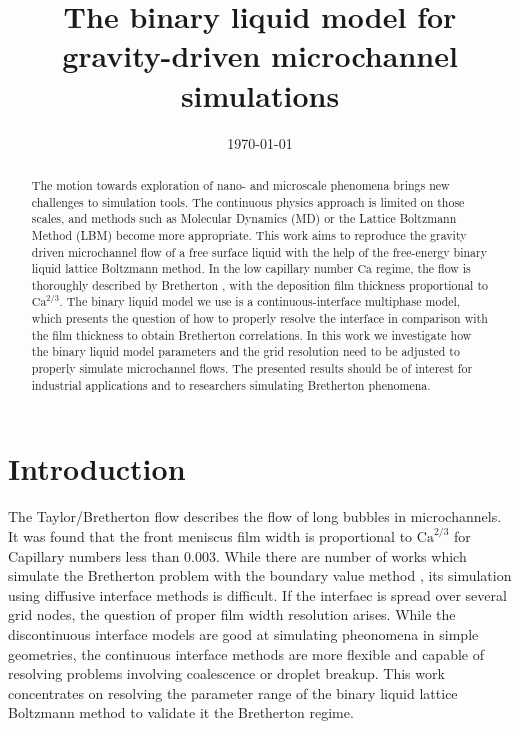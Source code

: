 \documentclass{article}
\title{The binary liquid model for gravity-driven microchannel simulations}
\date{\today}
\newcommand{\Ca}{\mathrm{Ca}}
\begin{document}
\maketitle

\begin{abstract}
The motion towards exploration of nano- and microscale phenomena brings new
challenges to simulation tools. The continuous physics approach is limited on
those scales, and methods such as Molecular Dynamics (MD) or the Lattice
Boltzmann Method (LBM) become more appropriate. This work aims to
reproduce the gravity driven microchannel flow of a free surface liquid with the
help of the free-energy binary liquid lattice Boltzmann method. In the low capillary number
$\Ca$ regime, the flow is thoroughly described by Bretherton \cite{bretherton},
with the deposition film thickness proportional to $\Ca^{2/3}$. The binary
liquid model we use is a continuous-interface multiphase model, which presents
the question of how to properly resolve the interface in comparison with the film thickness to
obtain Bretherton correlations.
In this work we investigate how the binary liquid model parameters and the grid resolution
need to be adjusted to properly simulate microchannel flows.  The presented results
should be of interest for industrial applications and to researchers simulating
Bretherton phenomena.
\end{abstract}


\section{Introduction}
The Taylor/Bretherton \cite{bretherton} flow describes the flow of long bubbles in
microchannels. It was found that the front meniscus film width is proportional
to $\Ca^{2/3}$ for Capillary numbers less than $0.003$. While there are number
of works which simulate the Bretherton problem with the boundary value method
\cite{ingham-plates,heil-bretherton}, its simulation using diffusive interface methods
is difficult.  If the interfaec is spread over several grid nodes, the question of
proper film width resolution arises. While the discontinuous interface models
are good at simulating pheonomena in simple geometries, the continuous interface
methods are more flexible and capable of resolving problems involving coalescence
or droplet breakup. This work
concentrates on resolving the parameter range of the binary liquid lattice
Boltzmann method to validate it the Bretherton regime.
\end{document}

